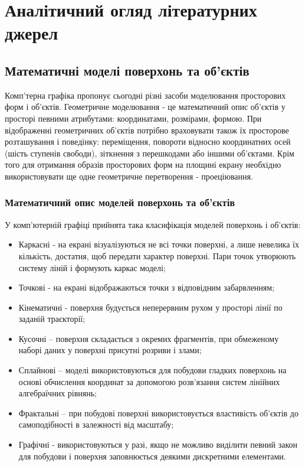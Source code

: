 \let\mypdfximage\pdfximage\def\pdfximage{\immediate\mypdfximage}\documentclass[14pt,a4paper]{extarticle}
\theoremstyle{definition}
\renewcommand{\[}{\begin{singlespace}\begin{equation*}}
\renewcommand{\]}{\end{equation*}\end{singlespace}}
\renewcommand{\+}{\discretionary{\mbox{\scriptsize$\hookleftarrow$}}{}{}}
\begin{document}
\section{Аналітичний огляд літературних джерел}

\subsection{Математичні моделі поверхонь та об'єктів}

Комп'терна графіка пропонує сьогодні різні засоби моделювання просторових форм і об'єктів. Геометричне моделювання - це математичний опис об'єктів у просторі певними атрибутами: координатами, розмірами, формою. При відображенні геометричних об'єктів потрібно враховувати також їх просторове розташування і поведінку: переміщення, повороти відносно координатних осей (шість ступенів свободи), зіткнення з перешкодами або іншими об'єктами. Крім того для отримання образів просторових форм на площині екрану необхідно використовувати ще одне геометричне перетворення - проеціювання. 

\subsubsection{Математичний опис моделей поверхонь та об’єктів}

У комп'ютерній графіці прийнята така класифікація моделей поверхонь і об'єктів:
\begin{itemize}
\item Каркасні - на екрані візуалізуються не всі точки поверхні, а лише невелика їх кількість, достатня, щоб передати характер поверхні. Пари точок утворюють  систему ліній і формують каркас моделі;
\item Точкові - на екрані відображаються точки з відповідним забарвленням;
\item Кінематичні - поверхня будується неперервним рухом у просторі лінії по заданій траєкторії;
\item Кусочні – поверхня складається з окремих фрагментів,  при обмеженому наборі даних у поверхні присутні розриви і злами;
\item Сплайнові – моделі використовуються для побудови гладких поверхонь на основі обчислення координат за допомогою розв'язання систем лінійних алгебраїчних рівнянь;
\item Фрактальні – при побудові поверхні використовується властивість об'єктів до самоподібності в залежності від масштабу;
\item Графічні - використовуються у разі, якщо не можливо виділити певний закон для побудови і поверхня заповнюється деякими дискретними елементами.
\end{itemize}
\end{document}
